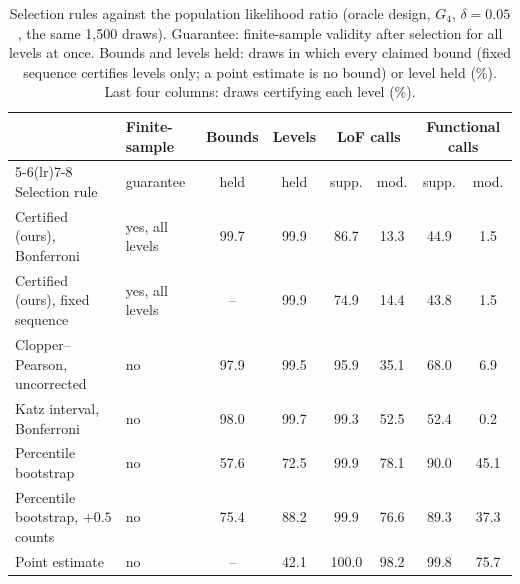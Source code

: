 \begin{table}[t]
\centering
\caption{Selection rules against the population likelihood ratio (oracle design, $G_4$, $\delta=0.05$, the same 1,500
draws). Guarantee: finite-sample validity after selection for all levels at once. Bounds and levels held: draws in which
every claimed bound (fixed sequence certifies levels only; a point estimate is no bound) or level held (\%). Last four columns: draws certifying each
level (\%).}
\label{tab:oracle}
\setlength{\tabcolsep}{3.4pt}
\begin{tabular}{llcccccc}
\toprule
 & Finite-sample & Bounds & Levels & \multicolumn{2}{c}{LoF calls} & \multicolumn{2}{c}{Functional calls}\\
\cmidrule(lr){5-6}\cmidrule(lr){7-8}
Selection rule & guarantee & held & held & supp. & mod. & supp. & mod.\\
\midrule
Certified (ours), Bonferroni & yes, all levels & 99.7 & 99.9 & 86.7 & 13.3 & 44.9 & 1.5 \\
Certified (ours), fixed sequence & yes, all levels & -- & 99.9 & 74.9 & 14.4 & 43.8 & 1.5 \\
Clopper--Pearson, uncorrected & no & 97.9 & 99.5 & 95.9 & 35.1 & 68.0 & 6.9 \\
Katz interval, Bonferroni & no & 98.0 & 99.7 & 99.3 & 52.5 & 52.4 & 0.2 \\
Percentile bootstrap & no & 57.6 & 72.5 & 99.9 & 78.1 & 90.0 & 45.1 \\
Percentile bootstrap, $+0.5$ counts & no & 75.4 & 88.2 & 99.9 & 76.6 & 89.3 & 37.3 \\
Point estimate & no & -- & 42.1 & 100.0 & 98.2 & 99.8 & 75.7 \\
\bottomrule
\end{tabular}
\end{table}
